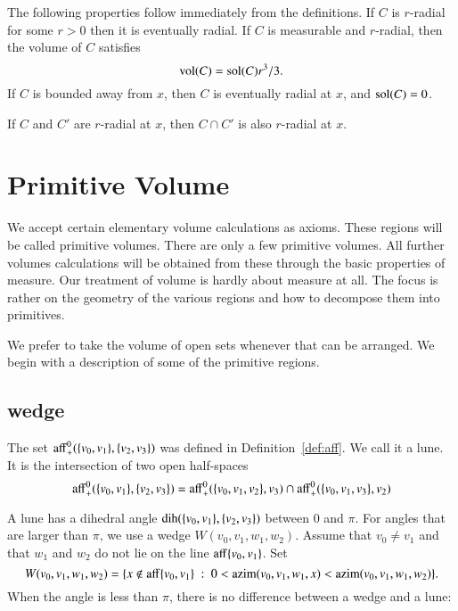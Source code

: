 The following properties follow immediately from the definitions.
If $C$ is $r$-radial for some $r>0$ then it is eventually radial.
If $C$ is measurable and $r$-radial, then the volume of $C$
satisfies
    $$
    {\operatorname{vol}}(C) = {\operatorname{sol}}(C) r^3/3.
    $$
If $C$ is bounded away from $x$, then $C$ is eventually radial at
$x$, and ${\operatorname{sol}}(C) = 0$.

\begin{lemma}  If $C$ and $C'$ are  $r$-radial
at $x$, then $C\cap C'$ is also $r$-radial at
$x$.
\end{lemma}






\section{Primitive Volume}

We accept 
certain elementary volume calculations as axioms.  
These regions will be called primitive volumes.  There are only
a few primitive volumes.
All further
volumes calculations will be obtained from these through the basic
properties of measure.   
Our treatment of volume 
is hardly about measure at all.  The focus is rather on
the geometry of the various regions and how to decompose them into
primitives.

We prefer to take the volume of open sets whenever that can be
arranged.  We begin with a description of some of the primitive
regions.









\subsection{wedge}


The set ${\operatorname{aff}}^0_+(\{v_0,v_1\},\{v_2,v_3\})$ was defined
in Definition~\ref{def:aff}.  We call it a lune.  It is the intersection
of two open half-spaces
    $$
    {\operatorname{aff}}^0_+(\{v_0,v_1\},\{v_2,v_3\})
    ={\operatorname{aff}}^0_+(\{v_0,v_1,v_2\},v_3)\cap
    {\operatorname{aff}}^0_+(\{v_0,v_1,v_3\},v_2)
    $$


A lune has a dihedral angle $\operatorname{dih}(\{v_0,v_1\},\{v_2,v_3\})$ between
$0$ and $\pi$.   For angles that are larger than $\pi$,  we use a wedge
$W(v_0,v_1,w_1,w_2)$.  Assume that $v_0\ne v_1$ and that
$w_1$ and $w_2$ do not lie on
the line ${\operatorname{aff}}\{v_0,v_1\}$.  Set
$$
W(v_0,v_1,w_1,w_2) = 
  \{x\not\in{\operatorname{aff}}\{v_0,v_1\} \ :\  
  0< {\operatorname{azim}}(v_0,v_1,w_1,x) < {\operatorname{azim}}(v_0,v_1,w_1,w_2)\}.
$$
When the angle is less than $\pi$, there is no difference between
a wedge and a lune:

